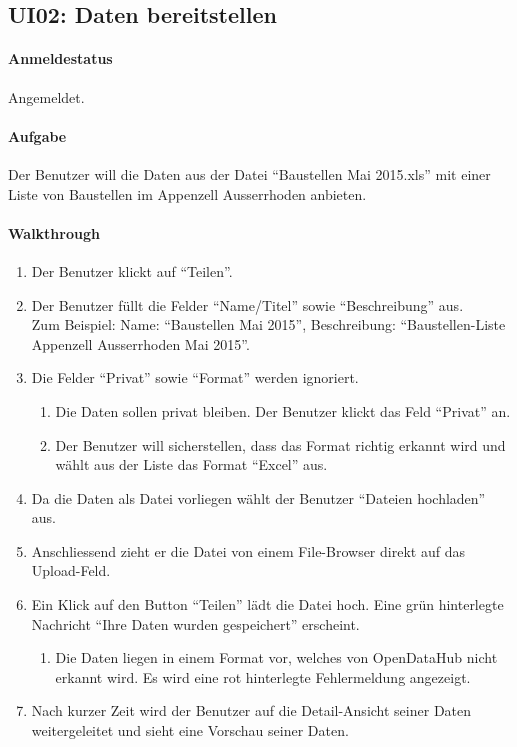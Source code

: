 \subsection{UI02: Daten bereitstellen}
\paragraph{Anmeldestatus} Angemeldet.

\paragraph{Aufgabe} Der Benutzer will die Daten aus der Datei ``Baustellen Mai 2015.xls'' mit einer Liste von Baustellen im Appenzell Ausserrhoden anbieten.

\paragraph{Walkthrough}
\begin{enumerate}
\item Der Benutzer klickt auf ``Teilen''.
\item Der Benutzer füllt die Felder ``Name/Titel'' sowie ``Beschreibung'' aus. \\
      Zum Beispiel: Name: ``Baustellen Mai 2015'', Beschreibung: ``Baustellen-Liste Appenzell Ausserrhoden Mai 2015''.
\item Die Felder ``Privat'' sowie ``Format'' werden ignoriert.
  \begin{enumerate}[label=\labelenumi\alph*.]
  \item Die Daten sollen privat bleiben. Der Benutzer klickt das Feld ``Privat'' an.
  \item Der Benutzer will sicherstellen, dass das Format richtig erkannt wird und wählt aus der Liste das Format ``Excel'' aus.
  \end{enumerate}
\item Da die Daten als Datei vorliegen wählt der Benutzer ``Dateien hochladen'' aus.
\item Anschliessend zieht er die Datei von einem File-Browser direkt auf das Upload-Feld.
\item Ein Klick auf den Button ``Teilen'' lädt die Datei hoch. Eine grün hinterlegte Nachricht ``Ihre Daten wurden gespeichert'' erscheint.  
  \begin{enumerate}[label=\labelenumi\alph*.]
  \item Die Daten liegen in einem Format vor, welches von OpenDataHub nicht erkannt wird. Es wird eine rot hinterlegte Fehlermeldung angezeigt.
  \end{enumerate}
\item Nach kurzer Zeit wird der Benutzer auf die Detail-Ansicht seiner Daten weitergeleitet und sieht eine Vorschau seiner Daten.
\end{enumerate}

